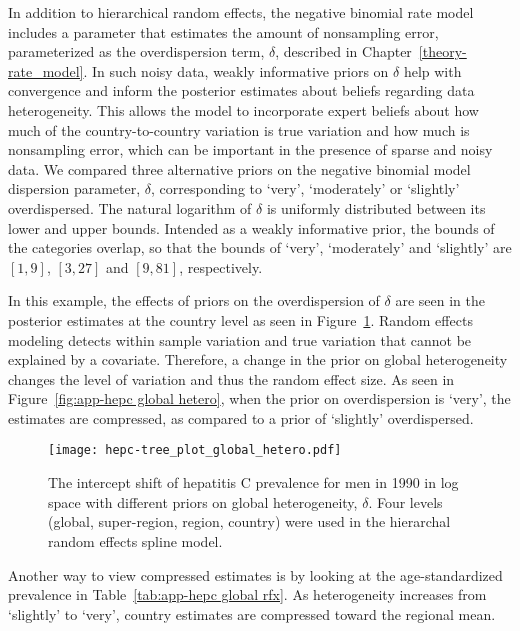 In addition to hierarchical random effects, the negative binomial
rate model includes a parameter that estimates
the amount of nonsampling error, parameterized as the overdispersion
term, $\delta$, described in Chapter~\ref{theory-rate_model}.
In such noisy data, weakly informative priors on $\delta$ help with
convergence and inform the posterior estimates about beliefs
regarding data heterogeneity.  This allows the model to incorporate
expert beliefs about how much of the country-to-country variation is
true variation and how much is nonsampling error, which can be
important in the presence of sparse and noisy data.  We compared three
alternative priors on the negative binomial model dispersion
parameter, $\delta$, corresponding to `very', `moderately' or
`slightly' overdispersed.  The natural logarithm of $\delta$ is
uniformly distributed between its lower and upper bounds.  Intended as
a weakly informative prior, the bounds of the categories overlap, so
that the bounds of `very', `moderately' and `slightly' are $[1,9]$, $[3,27]$ and
$[9,81]$, respectively.

In this example, the effects of priors on the overdispersion of
$\delta$ are seen in the posterior estimates at the country level as
seen in Figure~\ref{fig:app-hepc global hetero}.  Random effects
modeling detects within sample variation and true variation that
cannot be explained by a covariate.  Therefore, a change in the prior
on global heterogeneity changes the level of variation and thus the
random effect size.  As seen in Figure~\ref{fig:app-hepc global
  hetero}, when the prior on overdispersion is `very', the estimates
are compressed, as compared to a prior of `slightly' overdispersed.

    \begin{figure}[h]
        \begin{center}
            \texttt{[image: hepc-tree\_plot\_global\_hetero.pdf]}
            \caption{The intercept shift of hepatitis C
              prevalence for men in 1990 in log space with different priors on
              global heterogeneity, $\delta$.  Four levels (global,
              super-region, region, country) were used in the
              hierarchal random effects spline model.}
            \label{fig:app-hepc global hetero}
        \end{center}
    \end{figure}

Another way to view compressed estimates is by looking at the
age-standardized prevalence in Table~\ref{tab:app-hepc global rfx}.
As heterogeneity increases from `slightly' to `very', country
estimates are compressed toward the regional mean.

